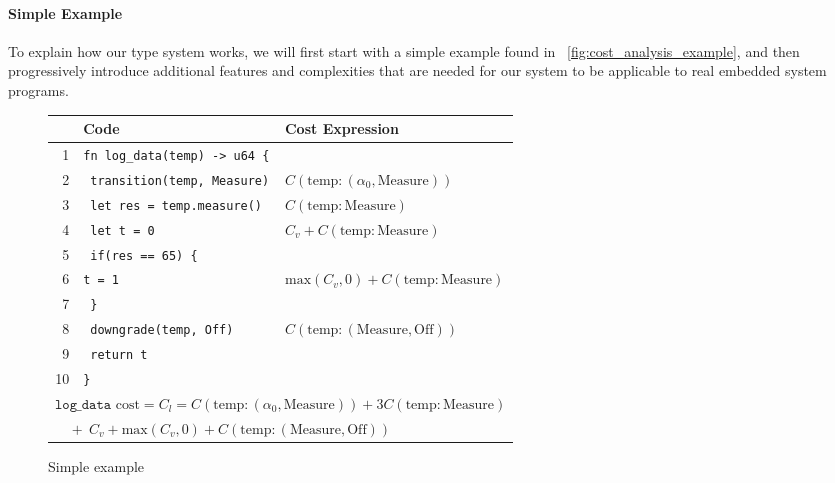 \paragraph{Simple Example}
To explain how our type system works, we will first start with a simple example found in ~\autoref{fig:cost_analysis_example}, and then progressively introduce additional features and complexities that are needed for our system to be applicable to real embedded system programs. 
\begin{figure}[h]
\small
\setlength{\tabcolsep}{3pt}
\begin{tabular}{|r|p{4cm}|l|}
\hline
\textbf{} & \textbf{Code} & \textbf{Cost Expression} \\
\hline
1 & \texttt{fn log\_data(temp) -> u64 \{} & \\
2 & \ \texttt{transition(temp, Measure)} & $C(\text{temp}: (\alpha_0, \text{Measure}))$ \\
3 & \ \texttt{let res = temp.measure()} & $C(\text{temp}: \text{Measure})$ \\
4 & \ \texttt{let t = 0} & $C_v + C(\text{temp}: \text{Measure})$ \\
5 & \ \texttt{if(res == 65) \{} & \\
6 & \quad \texttt{t = 1} & $\text{max}(C_v, 0) + C(\text{temp}: \text{Measure})$ \\
7 & \ \texttt{\}} & \\
8 & \ \texttt{downgrade(temp, Off)} & $C(\text{temp}: (\text{Measure},\text{Off}))$ \\
9 & \ \texttt{return t} & \\
10 & \texttt{\}} & \\
\hline
\multicolumn{3}{|l|}{$\texttt{log\_data} \text{ cost} = C_l = C(\text{temp}: (\alpha_0, \text{Measure})) + 3C(\text{temp}: \text{Measure})$} \\
\multicolumn{3}{|l|}{$\phantom{C_l} + \ C_v + \text{max}(C_v, 0) + C(\text{temp}: (\text{Measure}, \text{Off}))$} \\
\hline
\end{tabular}
\caption{Simple example}
\label{fig:cost_analysis_example}
\end{figure}

